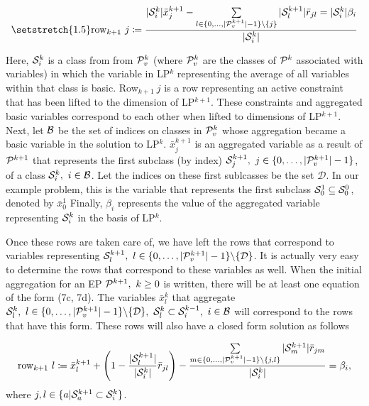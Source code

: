 \documentclass[11pt]{article} %
\newcommand{\cP}{{\cal P}}
\newcommand{\cB}{{\cal B}}
\newcommand{\cS}{{\cal S}}
\begin{document}
	\begin{equation}\setstretch{1.5}
	\text{row}_{k + 1} \ j \coloneqq \frac{|\cS_i^{k}|\bar{x}_j^{k + 1} - \sum\limits_{l \in \{0, \dots, |\cP^{k + 1}_v| - 1\} \backslash \{j\}}|\cS^{k + 1}_l|\bar{r}_{jl} = |\cS^{k}_i|\beta_i}{|\cS_i^{k}|}
	\end{equation}
	
	Here, $\cS_i^{k}$ is a class from from $\cP^k_v$ (where $\cP^k_v$ are the classes of $\cP^k$ associated with variables)  in which the variable in LP$^k$ representing the average of all variables within that class is basic.  Row$_{k + 1} \ j$ is a row representing an active constraint that has been lifted to the dimension of LP$^{k + 1}$.  These constraints and aggregated basic variables correspond to each other when lifted to dimensions of LP$^{k + 1}$.  Next, let $\cB$ be the set of indices on classes in $\cP^k_v$ whose aggregation became a basic variable in the solution to LP$^k$.  $\bar{x}_j^{k + 1}$ is an aggregated variable as a result of $\cP^{k + 1}$ that represents the first subclass (by index) $\cS_j^{k + 1}, \ j  \in \{0, \dots, |\cP^{k + 1}_v| - 1\}$, of a class $\cS_i^k , \ i \in \cB$.  Let the indices on these first sublcasses be the set $\mathcal{D}$.  In our example problem, this is the variable that represents the first subclass $\cS_0^1 \subseteq \cS_0^0$, denoted by $\bar{x}_0^1$  Finally, $\beta_i$ represents the value of the aggregated variable representing $\cS_i^k$ in the basis of LP$^k$.
	
	Once these rows are taken care of, we have left the rows that correspond to variables representing $\cS_l^{k + 1},\ l \in  \{0, \dots, |\cP^{k + 1}_v| - 1\} \backslash \{\mathcal{D}\}$.  It is actually very easy to determine the rows that correspond to these variables as well.  When the initial aggregation for an EP $\cP^{k + 1}, \ k \geq 0$ is written, there will be at least one equation of the form (7c, 7d).  The variables $\bar{x}_l^k$ that aggregate $ \cS_l^k, \  l \in  \{0, \dots, |\cP^{k + 1}_v| - 1\} \backslash \{\mathcal{D}\}, \ \cS_l^k \subset \cS_i^{k - 1}, \ i \in \cB$ will correspond to the rows that have this form.  These rows will also have a closed form solution as follows
	
	\begin{equation}
	\text{row}_{k + 1} \ l \coloneqq \bar{x}_l^{k + 1} + \left(1 - \frac{|\cS^{k + 1}_l|}{|\cS_i^{k}|}\bar{r}_{jl}\right) - \frac{\sum\limits_{m \in \{0, \dots, |\cP^{k + 1}_v| - 1\} \backslash \{j, l\}}|\cS^{k + 1}_m|\bar{r}_{jm}}{|\cS_i^{k}|} = \beta_i, 
	\end{equation}
	where $j,l \in \{a|\cS_a^{k + 1} \subset \cS_i^{k} \}$.
	
\end{document}

